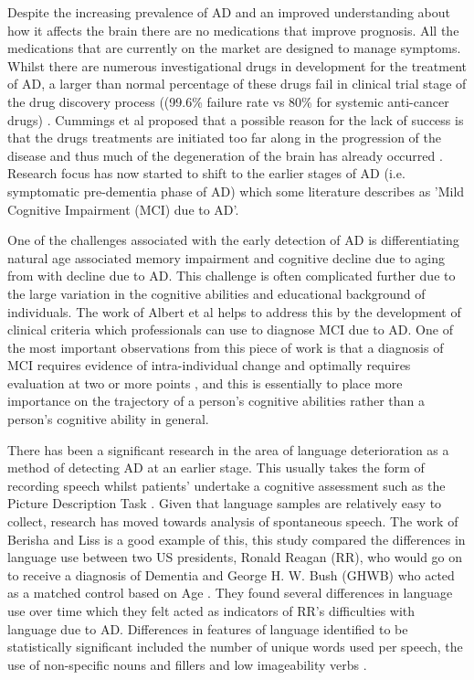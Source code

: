 \documentclass[10pt, letterpaper, twoside, openany]{thesis}
\begin{document}
\par
Despite the increasing prevalence of AD and an improved understanding about how it affects the brain there are no medications that improve prognosis. All the medications that are currently on the market are designed to manage symptoms. Whilst there are numerous investigational drugs in development for the treatment of AD, a larger than normal percentage of these drugs fail in clinical trial stage of the drug discovery process ((99.6\% failure rate vs 80\% for systemic anti-cancer drugs) \cite{Cummings2014}. Cummings et al proposed that a possible reason for the lack of success is that the drugs treatments are initiated too far along in the progression of the disease and thus much of the degeneration of the brain has already occurred \cite{Cummings2014}. Research focus has now started to shift to the earlier stages of AD (i.e. symptomatic pre-dementia phase of AD) which some literature describes as 'Mild Cognitive Impairment (MCI) due to AD'.
\par
One of the challenges associated with the early detection of AD is differentiating natural age associated memory impairment and cognitive decline due to aging from with decline due to AD. This challenge is often complicated further due to the large variation in the cognitive abilities and educational background of individuals. The work of Albert et al helps to address this by the development of clinical criteria which professionals can use to diagnose MCI due to AD. One of the most important observations from this piece of work is that a diagnosis of MCI requires evidence of intra-individual change and optimally requires evaluation at two or more points \cite{Albert2011}, and this is essentially to place more importance on the trajectory of a person's cognitive abilities rather than a person's cognitive ability in general. 
\par 
There has been a significant research in the area of language deterioration as a method of detecting AD at an earlier stage. This usually takes the form of recording speech whilst patients' undertake a cognitive assessment such as the Picture Description Task \cite{Fraser2015}. Given that language samples are relatively easy to collect, research has moved towards analysis of spontaneous speech. The work of Berisha and Liss is a good example of this, this study compared the differences in language use between two US presidents, Ronald Reagan (RR), who would go on to receive a diagnosis of Dementia and George H. W. Bush (GHWB) who acted as a matched control based on Age \cite{Berisha2015}. They found several differences in language use over time which they felt acted as indicators of RR's difficulties with language due to AD. Differences in features of language identified to be statistically significant included the number of unique words used per speech, the use of non-specific nouns and fillers and low imageability verbs \cite{Berisha2015}. 
\end{document}
